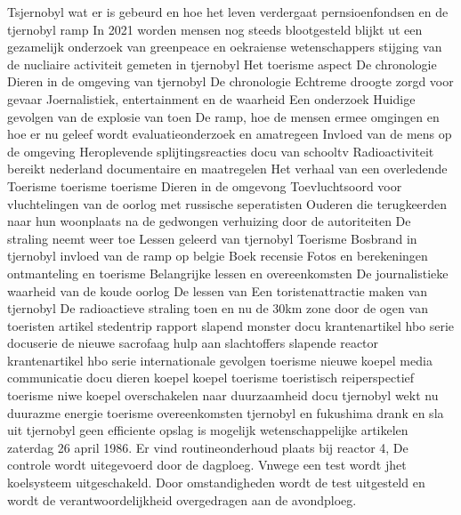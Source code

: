 \cite{INSAVienna1992Chernobyl}
Tsjernobyl
\cite{wikiTjernobyl}
\cite{rivmTjernobyl}
\cite{andereTijdenTjernobyl}
wat er is gebeurd en hoe het leven verdergaat
\cite{kingskey19042022tjernobyl}
pernsioenfondsen en de tjernobyl ramp
In 2021 worden mensen nog steeds blootgesteld blijkt ut een gezamelijk onderzoek van greenpeace en oekraiense wetenschappers
stijging van de nucliaire activiteit gemeten in tjernobyl
Het toerisme  aspect
De chronologie
\cite{erikbork26042023reactor4}
\cite{nosTjernobyl30jaarlater}
Dieren in de omgeving van tjernobyl
De chronologie
Echtreme droogte zorgd voor gevaar
\cite{knmi04052021tjernobylbosbrand}
\cite{dodonovaKVIRisicoTjernobyl}
Joernalistiek, entertainment en de waarheid
\cite{dumarey04062020verhaalTjernobylWaarheid}
Een onderzoek
Huidige gevolgen van de explosie van toen
\cite{sparkesNewScientistTjernoby}
De ramp, hoe de mensen ermee omgingen en hoe er nu geleef wordt
evaluatieonderzoek en amatregeen
\cite{kernenergiened26041986chronologiemaatregelen}
\cite{mapszoneReactor}
Invloed van de mens op de omgeving
Heroplevende splijtingsreacties
docu van schooltv
Radioactiviteit bereikt nederland
documentaire en maatregelen
\cite{kernhistoriek15062021tjernobyl}
Het verhaal van een overledende
Toerisme
toerisme
toerisme
Dieren in de omgevong
Toevluchtsoord voor vluchtelingen van de oorlog met russische seperatisten
Ouderen die terugkeerden naar hun woonplaats na de gedwongen verhuizing door de autoriteiten
De straling neemt weer toe
Lessen geleerd van tjernobyl
\cite{nucleairforumFeitenTjernobyl}
Toerisme
Bosbrand in tjernobyl
invloed van de ramp op belgie
\cite{kernongevalTjernobylFancGov}
Boek recensie
Fotos en berekeningen
ontmanteling en toerisme
Belangrijke lessen en overeenkomsten
De journalistieke waarheid van de koude oorlog
De lessen van
\cite{arendswolters062019lessenTjernobyl}
Een toristenattractie maken van tjernobyl
De radioactieve straling toen en nu
de 30km zone door de ogen van toeristen
artikel
stedentrip
rapport
\cite{damveld08052020tjernobyl}
slapend monster
docu
krantenartikel
hbo serie
docuserie
de  nieuwe sacrofaag
hulp aan slachtoffers
slapende reactor
krantenartikel
\cite{deVriestjernobylHolland}
hbo serie
internationale gevolgen
toerisme
nieuwe koepel
media communicatie
docu
dieren
koepel
koepel
\cite{ing3enieur29042015antistralingskoepel}
toerisme
toeristisch reiperspectief
toerisme
niwe koepel
overschakelen naar duurzaamheid
docu
tjernobyl wekt nu duurazme energie
toerisme
overeenkomsten tjernobyl en fukushima
drank en sla uit tjernobyl
geen efficiente opslag is mogelijk
wetenschappelijke artikelen
zaterdag 26 april 1986. Er vind routineonderhoud plaats bij reactor 4, De controle wordt uitegevoerd door de dagploeg. Vnwege een test wordt jhet koelsysteem uitgeschakeld. Door omstandigheden wordt de test uitgesteld en wordt de verantwoordelijkheid overgedragen aan de avondploeg.
